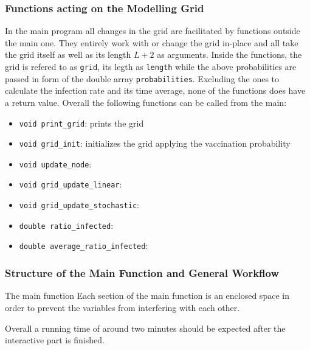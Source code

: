 \subsubsection*{Functions acting on the Modelling Grid}

In the main program all changes in the grid are facilitated by functions outside the main one. They entirely work with or change the grid in-place and all take the grid itself as well as its length $L+2$ as arguments.
Inside the functions, the grid is refered to as \texttt{grid}, its legth as \texttt{length} while the above probabilities are passed in form of the double array \texttt{probabilities}.
Excluding the ones to calculate the infection rate and its time average, none of the functions does have a return value. Overall the following functions can be called from the main:
\begin{itemize}
    \item \texttt{void print\_grid}: prints the grid
    \item \texttt{void grid\_init}: initializes the grid applying the vaccination probability
    \item \texttt{void update\_node}:
    \item \texttt{void grid\_update\_linear}:
    \item \texttt{void grid\_update\_stochastic}:
    \item \texttt{double ratio\_infected}:
    \item \texttt{double average\_ratio\_infected}:
\end{itemize}

\subsubsection*{Structure of the Main Function and General Workflow}

The main function Each section of the main function is an enclosed space in order to prevent the variables from interfering with each other.

Overall a running time of around two minutes should be expected after the interactive part is finished.


